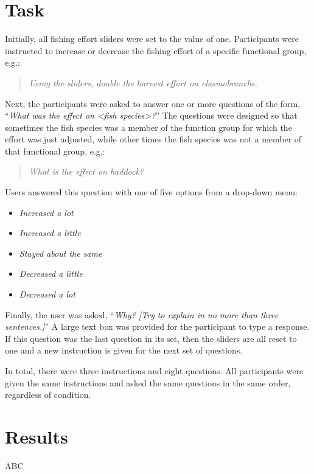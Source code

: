 \section{Task}

Initially, all fishing effort sliders were set to the value of one.  Participants were  instructed to increase or decrease the fishing effort of a specific functional group, e.g.:
\begin{quote}
\textit{Using the sliders, double the harvest effort on elasmobranchs.}
\end{quote}

Next, the participants were asked to answer one or more questions of the form, ``\textit{What was the effect on <fish species>?}''  The questions were designed so that sometimes the fish species was a member of the function group for which the effort was just adjusted, while other times the fish species was not a member of that functional group, e.g.:
\begin{quote}
\textit{What is the effect on haddock?}
\end{quote}
Users answered this question with one of five options from a drop-down menu:
\begin{itemize}
\item \textit{Increased a lot}
\item \textit{Increased a little}
\item \textit{Stayed about the same}
\item \textit{Decreased a little}
\item \textit{Decreased a lot}
\end{itemize}

Finally, the user was asked, ``\textit{Why? [Try to explain in no more than three sentences.]}''  A large text box was provided for the participant to type a response.  If this question was the last question in its set, then the sliders are all reset to one and a new instruction is given for the next set of questions. 

In total, there were three instructions and eight questions.  All participants were given the same instructions and asked the same questions in the same order, regardless of condition.

\section{Results}

ABC
